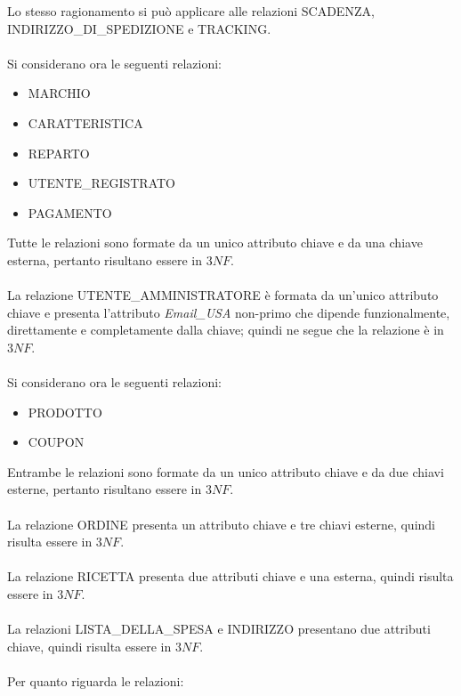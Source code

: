 Lo stesso ragionamento si può applicare alle relazioni SCADENZA, INDIRIZZO\_DI\_SPEDIZIONE e TRACKING. \\
\\
Si considerano ora le seguenti relazioni:
\begin{itemize}
	
	\item
	MARCHIO
	
	\item
	CARATTERISTICA
	
	\item
	REPARTO
	
	\item
	UTENTE\_REGISTRATO
	
	\item
	PAGAMENTO
	
\end{itemize}
Tutte le relazioni sono formate da un unico attributo chiave e da una chiave esterna, pertanto risultano essere in $3NF$.\\
\\
La relazione UTENTE\_AMMINISTRATORE è formata da un'unico attributo chiave e presenta l'attributo \emph{Email\_USA} non-primo che dipende funzionalmente, direttamente e completamente dalla chiave;
quindi ne segue che la relazione è in $3NF$.\\
\\
Si considerano ora le seguenti relazioni:
\begin{itemize}
	
	\item
	PRODOTTO
	
	\item
	COUPON
	
\end{itemize}
Entrambe le relazioni sono formate da un unico attributo chiave e da due chiavi esterne, pertanto risultano essere in $3NF$. \\
\\
La relazione ORDINE presenta un attributo chiave e tre chiavi esterne, quindi risulta essere in $3NF$. \\
\\
La relazione RICETTA presenta due attributi chiave e una esterna, quindi risulta essere in $3NF$. \\
\\
La relazioni LISTA\_DELLA\_SPESA e INDIRIZZO presentano due attributi chiave, quindi risulta essere in $3NF$. \\
\\
Per quanto riguarda le relazioni:
